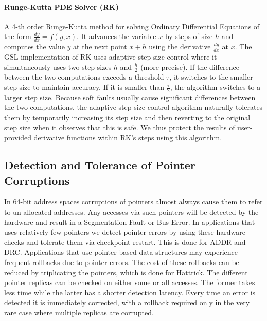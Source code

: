 \documentclass[10pt, conference, compsocconf]{IEEEtran}
\begin{document}
\paragraph{Runge-Kutta PDE Solver (RK)}
A 4-th order Runge-Kutta method for solving Ordinary Differential Equations of the form $\frac{dy}{dx} = f(y, x)$.
It advances the variable $x$ by steps of size $h$ and computes the value $y$ at the next point $x+h$ using the derivative $\frac{dy}{dx}$ at $x$.
The GSL implementation of RK uses adaptive step-size control where it simultaneously uses two step sizes $h$ and $\frac{h}{2}$ (more precise).
If the difference between the two computations exceeds a threshold $\tau$, it switches to the smaller step size to maintain accuracy.%
If it is smaller than $\frac{\tau}{2}$, the algorithm switches to a larger step size.
Because soft faults usually cause significant differences between the two computations, the adaptive step size control algorithm naturally tolerates them by temporarily increasing its step size and then reverting to the original step size when it observes that this is safe.
We thus protect the results of user-provided derivative functions within RK's steps using this algorithm.

\subsection{Detection and Tolerance of Pointer Corruptions}
\label{sec:res_tech:pointers}
In 64-bit address spaces corruptions of pointers almost always cause them to refer to un-allocated addresses.
Any accesses via such pointers will be detected by the hardware and result in a Segmentation Fault or Bus Error.
In applications that uses relatively few pointers we detect pointer errors by using these hardware checks and tolerate them via checkpoint-restart.
This is done for ADDR and DRC.
Applications that use pointer-based data structures may experience frequent rollbacks due to pointer errors.
The cost of these rollbacks can be reduced by triplicating the pointers, which is done for Hattrick.
The different pointer replicas can be checked on either some or all accesses.
The former takes less time while the latter has a shorter detection latency.
Every time an error is detected it is immediately corrected, with a rollback required only in the very rare case where multiple replicas are corrupted.
\end{document}
